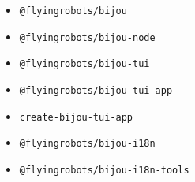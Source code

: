 \begin{itemize}
\tightlist
\item
  \texttt{@\allowbreak{}f\allowbreak{}l\allowbreak{}y\allowbreak{}i\allowbreak{}n\allowbreak{}g\allowbreak{}r\allowbreak{}o\allowbreak{}b\allowbreak{}o\allowbreak{}t\allowbreak{}s\allowbreak{}/\allowbreak{}b\allowbreak{}i\allowbreak{}j\allowbreak{}o\allowbreak{}u}
\item
  \texttt{@\allowbreak{}f\allowbreak{}l\allowbreak{}y\allowbreak{}i\allowbreak{}n\allowbreak{}g\allowbreak{}r\allowbreak{}o\allowbreak{}b\allowbreak{}o\allowbreak{}t\allowbreak{}s\allowbreak{}/\allowbreak{}b\allowbreak{}i\allowbreak{}j\allowbreak{}o\allowbreak{}u\allowbreak{}-\allowbreak{}n\allowbreak{}o\allowbreak{}d\allowbreak{}e}
\item
  \texttt{@\allowbreak{}f\allowbreak{}l\allowbreak{}y\allowbreak{}i\allowbreak{}n\allowbreak{}g\allowbreak{}r\allowbreak{}o\allowbreak{}b\allowbreak{}o\allowbreak{}t\allowbreak{}s\allowbreak{}/\allowbreak{}b\allowbreak{}i\allowbreak{}j\allowbreak{}o\allowbreak{}u\allowbreak{}-\allowbreak{}t\allowbreak{}u\allowbreak{}i}
\item
  \texttt{@\allowbreak{}f\allowbreak{}l\allowbreak{}y\allowbreak{}i\allowbreak{}n\allowbreak{}g\allowbreak{}r\allowbreak{}o\allowbreak{}b\allowbreak{}o\allowbreak{}t\allowbreak{}s\allowbreak{}/\allowbreak{}b\allowbreak{}i\allowbreak{}j\allowbreak{}o\allowbreak{}u\allowbreak{}-\allowbreak{}t\allowbreak{}u\allowbreak{}i\allowbreak{}-\allowbreak{}a\allowbreak{}p\allowbreak{}p}
\item
  \texttt{c\allowbreak{}r\allowbreak{}e\allowbreak{}a\allowbreak{}t\allowbreak{}e\allowbreak{}-\allowbreak{}b\allowbreak{}i\allowbreak{}j\allowbreak{}o\allowbreak{}u\allowbreak{}-\allowbreak{}t\allowbreak{}u\allowbreak{}i\allowbreak{}-\allowbreak{}a\allowbreak{}p\allowbreak{}p}
\item
  \texttt{@\allowbreak{}f\allowbreak{}l\allowbreak{}y\allowbreak{}i\allowbreak{}n\allowbreak{}g\allowbreak{}r\allowbreak{}o\allowbreak{}b\allowbreak{}o\allowbreak{}t\allowbreak{}s\allowbreak{}/\allowbreak{}b\allowbreak{}i\allowbreak{}j\allowbreak{}o\allowbreak{}u\allowbreak{}-\allowbreak{}i\allowbreak{}1\allowbreak{}8\allowbreak{}n}
\item
  \texttt{@\allowbreak{}f\allowbreak{}l\allowbreak{}y\allowbreak{}i\allowbreak{}n\allowbreak{}g\allowbreak{}r\allowbreak{}o\allowbreak{}b\allowbreak{}o\allowbreak{}t\allowbreak{}s\allowbreak{}/\allowbreak{}b\allowbreak{}i\allowbreak{}j\allowbreak{}o\allowbreak{}u\allowbreak{}-\allowbreak{}i\allowbreak{}1\allowbreak{}8\allowbreak{}n\allowbreak{}-\allowbreak{}t\allowbreak{}o\allowbreak{}o\allowbreak{}l\allowbreak{}s}

\end{itemize}
